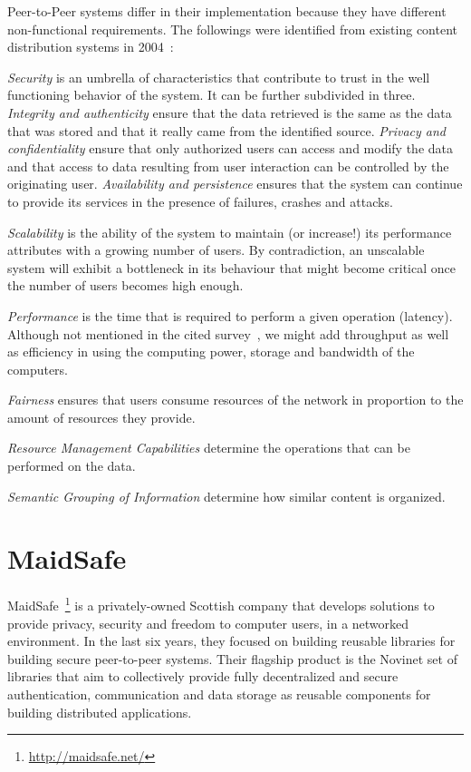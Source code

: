 Peer-to-Peer systems differ in their implementation because they have different non-functional requirements. The followings were identified from existing content distribution systems in 2004~\cite{Androutsellis-Theotokis:2004}:

\textit{Security} is an umbrella of characteristics that contribute to trust in the well functioning behavior of the system. It can be further subdivided in three. \textit{Integrity and authenticity} ensure that the data retrieved is the same as the data that was stored and that it really came from the identified source. \textit{Privacy and confidentiality} ensure that only authorized users can access and modify the data and that access to data resulting from user interaction can be controlled by the originating user. \textit{Availability and persistence} ensures that the system can continue to provide its services in the presence of failures, crashes and attacks.
 
\textit{Scalability} is the ability of the system to maintain (or increase!) its performance attributes with a growing number of users. By contradiction, an unscalable system will exhibit a bottleneck in its behaviour that might become critical once the number of users becomes high enough.

\textit{Performance} is the time that is required to perform a given operation (latency). Although not mentioned in the cited survey~\cite{Androutsellis-Theotokis:2004}, we might add throughput as well as efficiency in using the computing power, storage and bandwidth of the computers.

\textit{Fairness} ensures that users consume resources of the network in proportion to the amount of resources they provide.

\textit{Resource Management Capabilities} determine the operations that can be performed on the data.

\textit{Semantic Grouping of Information} determine how similar content is organized.


\section{MaidSafe}

MaidSafe~\footnote{\url{http://maidsafe.net/}} is a privately-owned Scottish company that develops solutions to provide privacy, security and freedom to computer users, in a networked environment. In the last six years, they focused on building reusable libraries for building secure peer-to-peer systems. Their flagship product is the Novinet set of libraries that aim to collectively provide fully decentralized and secure authentication, communication and data storage as reusable components for building distributed applications.

